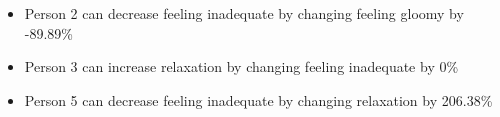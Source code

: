 \begin{itemize}\item Person 2 can decrease feeling inadequate by changing feeling gloomy by -89.89\%\item Person 3 can increase relaxation by changing feeling inadequate by 0\%\item Person 5 can decrease feeling inadequate by changing relaxation by 206.38\%\end{itemize}